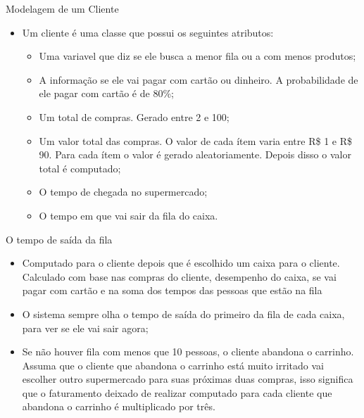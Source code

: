 \documentclass[12pt,table,xcolor={dvipsnames}]{beamer}
\begin{document}
\begin{frame}[fragile]{Modelagem de um Cliente}
\begin{itemize}
\item Um cliente é uma classe que possui os seguintes atributos:
\begin{itemize}
\item Uma variavel que diz se ele busca a menor fila ou a com menos produtos;
\item A informação se ele vai pagar com cartão ou dinheiro. A probabilidade de ele pagar com cartão é de 80\%;
\item Um total de compras. Gerado entre 2 e 100;
\item Um valor total das compras. O valor de cada ítem varia entre R\$ 1 e R\$ 90. Para cada ítem o valor é gerado aleatoriamente. Depois disso o valor total é computado;
\item O tempo de chegada no supermercado;
\item O tempo em que vai sair da fila do caixa.
\end{itemize}
\end{itemize}
\end{frame}


\begin{frame}[fragile]{O tempo de saída da fila}
\begin{itemize}
\item Computado para o cliente depois que é escolhido um caixa para o cliente. Calculado com base nas compras do cliente, desempenho do caixa, se vai pagar com cartão e na soma dos tempos das pessoas que estão na fila
\item O sistema sempre olha o tempo de saída do primeiro da fila de cada caixa, para ver se ele vai sair agora;
\item  Se não houver fila com menos que 10 pessoas, o cliente abandona o carrinho. Assuma que o cliente que abandona o carrinho está muito irritado vai escolher outro supermercado para suas próximas duas compras, isso significa que o faturamento deixado de realizar computado para cada cliente que abandona o carrinho é multiplicado por três.
\end{itemize}
\end{frame}
\end{document}
